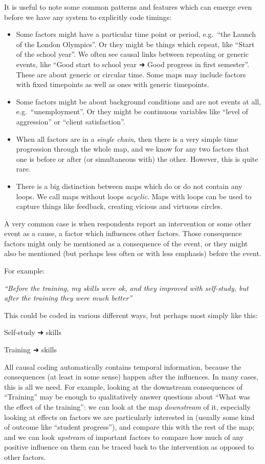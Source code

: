 \documentclass[
]{book}
\begin{document}
It is useful to note some common patterns and features which can emerge even before we have any system to explicitly code timings:

\begin{itemize}
\item
  Some factors might have a particular time point or period, e.g.~``the Launch of the London Olympics''. Or they might be things which repeat, like ``Start of the school year''. We often see causal links between repeating or generic events, like ``Good start to school year ➜ Good progress in first semester''. These are about generic or circular time. Some maps may include factors with fixed timepoints as well as ones with generic timepoints.
\item
  Some factors might be about background conditions and are not events at all, e.g.~``unemployment''. Or they might be continuous variables like ``level of aggression'' or ``client satisfaction''.
\item
  When all factors are in a \emph{single chain}, then there is a very simple time progression through the whole map, and we know for any two factors that one is before or after (or simultaneous with) the other. However, this is quite rare.
\item
  There is a big distinction between maps which do or do not contain any loops. We call maps without loops \emph{acyclic}. Maps with loops can be used to capture things like feedback, creating vicious and virtuous circles.
\end{itemize}

A very common case is when respondents report an intervention or some other event as a cause, a factor which influences other factors. Those consequence factors might only be mentioned as a consequence of the event, or they might also be mentioned (but perhaps less often or with less emphasis) before the event.

For example:

\emph{``Before the training, my skills were ok, and they improved with self-study, but after the training they were much better''}

This could be coded in various different ways, but perhaps most simply like this:

Self-study ➜ skills

Training ➜ skills

All causal coding automatically contains temporal information, because the consequences (at least in some sense) happen after the influences. In many cases, this is all we need. For example, looking at the downstream consequences of ``Training'' may be enough to qualitatively answer questions about ``What was the effect of the training'': we can look at the map \emph{downstream} of it, especially looking at effects on factors we are particularly interested in (usually some kind of outcome like ``student progress''), and compare this with the rest of the map; and we can look \emph{upstream} of important factors to compare how much of any positive influence on them can be traced back to the intervention as opposed to other factors.
\end{document}
